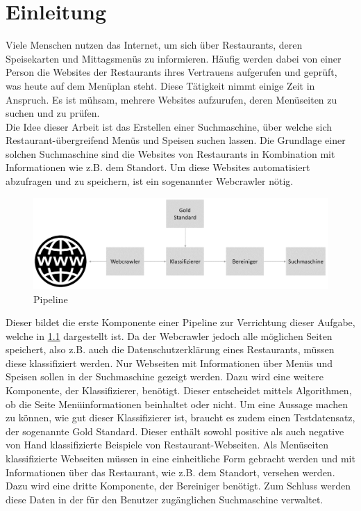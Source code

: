\chapter{Einleitung}
Viele Menschen nutzen das Internet, um sich über Restaurants, deren Speisekarten und Mittagsmenüs zu informieren.
Häufig werden dabei von einer Person die Websites der Restaurants ihres Vertrauens aufgerufen und geprüft, was heute auf dem Menüplan steht.
Diese Tätigkeit nimmt einige Zeit in Anspruch.
Es ist mühsam, mehrere Websites aufzurufen, deren Menüseiten zu suchen und zu prüfen.\\
Die Idee dieser Arbeit ist das Erstellen einer Suchmaschine, über welche sich Restaurant-übergreifend Menüs und Speisen suchen lassen.
Die Grundlage einer solchen Suchmaschine sind die Websites von Restaurants in Kombination mit Informationen wie z.B. dem Standort.
Um diese Websites automatisiert abzufragen und zu speichern, ist ein sogenannter Webcrawler nötig.
\begin{figure}[H]
	\centering	
	\includegraphics[width=1\columnwidth,keepaspectratio]{img/Ablauf_Einleitung.png}
	\caption{Pipeline}
	\label{fig:ablauf_einleitung}
\end{figure}
Dieser bildet die erste Komponente einer Pipeline zur Verrichtung dieser Aufgabe, welche in \cref{fig:ablauf_einleitung} dargestellt ist.
Da der Webcrawler jedoch alle möglichen Seiten speichert, also z.B. auch die Datenschutzerklärung eines Restaurants, müssen diese klassifiziert werden.
Nur Webseiten mit Informationen über Menüs und Speisen sollen in der Suchmaschine gezeigt werden.
Dazu wird eine weitere Komponente, der Klassifizierer, benötigt.
Dieser entscheidet mittels Algorithmen, ob die Seite Menüinformationen beinhaltet oder nicht.
Um eine Aussage machen zu können, wie gut dieser Klassifizierer ist, braucht es zudem einen Testdatensatz, der sogenannte Gold Standard.
Dieser enthält sowohl positive als auch negative von Hand klassifizierte Beispiele von Restaurant-Webseiten.
Als Menüseiten klassifizierte Webseiten müssen in eine einheitliche Form gebracht werden und mit Informationen über das Restaurant, wie z.B. dem Standort, versehen werden.
Dazu wird eine dritte Komponente, der Bereiniger benötigt.
Zum Schluss werden diese Daten in der für den Benutzer zugänglichen Suchmaschine verwaltet.  
